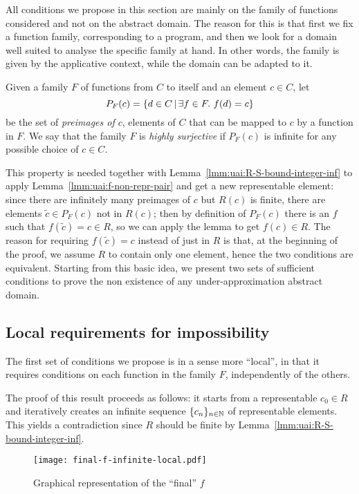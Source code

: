 All conditions we propose in this section are mainly on the family of functions considered and not on the abstract domain. The reason for this is that first we fix a function family, corresponding to a program, and then we look for a domain well suited to analyse the specific family at hand. In other words, the family is given by the applicative context, while the domain can be adapted to it.

\begin{definition}\label{def:uai:highly-onto-func-family}
	Given a family $F$ of functions from $C$ to itself and an element $c \in C$, let
	\[
	P_F(c) = \{ d \in C \,\vert\, \exists f \in F .\ f(d) = c \}
	\]
	be the set of \emph{preimages of $c$}, elements of $C$ that can be mapped to $c$ by a function in $F$.
	We say that the family $F$ is \emph{highly surjective} if $P_F(c)$ is infinite for any possible choice of $c \in C$.
\end{definition}
This property is needed together with Lemma~\ref{lmm:uai:R-S-bound-integer-inf} to apply Lemma~\ref{lmm:uai:f-non-repr-pair} and get a new representable element: since there are infinitely many preimages of $c$ but $R(c)$ is finite, there are elements $\tilde{c} \in P_F(c)$ not in $R(c)$; then by definition of $P_F(c)$ there is an $f$ such that $f(\tilde{c}) = c \in R$, so we can apply the lemma to get $f(c) \in R$.
The reason for requiring $f(\tilde{c}) = c$ instead of just in $R$ is that, at the beginning of the proof, we assume $R$ to contain only one element, hence the two conditions are equivalent.
Starting from this basic idea, we present two sets of sufficient conditions to prove the non existence of any under-approximation abstract domain.

\subsection{Local requirements for impossibility}
The first set of conditions we propose is in a sense more ``local'', in that it requires conditions on each function in the family $F$, independently of the others.

The proof of this result proceeds as follows: it starts from a representable $c_0 \in R$ and iteratively creates an infinite sequence $\{ c_n \}_{n \in \mathbb{N}}$ of representable elements. This yields a contradiction since $R$ should be finite by Lemma~\ref{lmm:uai:R-S-bound-integer-inf}.

\begin{figure*}[ht]
	\centering
	\texttt{[image: final-f-infinite-local.pdf]}
	\caption{Graphical representation of the ``final'' $f$}
	\label{fig:uai:final-f-sketch}
\end{figure*}

